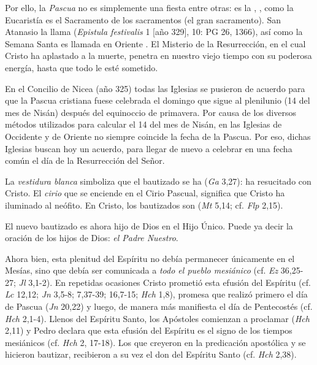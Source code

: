 \begin{ccebody}
 Por ello, la \textit{Pascua} no es simplemente una fiesta entre otras: es la , , como la Eucaristía es el Sacramento de los sacramentos (el gran sacramento). San Atanasio la llama  (\textit{Epistula festivalis} 1 [año 329], 10: PG 26, 1366), así como la Semana Santa es llamada en Oriente . El Misterio de la Resurrección, en el cual Cristo ha aplastado a la muerte, penetra en nuestro viejo tiempo con su poderosa energía, hasta que todo le esté sometido.

 En el Concilio de Nicea (año 325) todas las Iglesias se pusieron de acuerdo para que la Pascua cristiana fuese celebrada el domingo que sigue al plenilunio (14 del mes de Nisán) después del equinoccio de primavera. Por causa de los diversos métodos utilizados para calcular el 14 del mes de Nisán, en las Iglesias de Occidente y de Oriente no siempre coincide la fecha de la Pascua. Por eso, dichas Iglesias buscan hoy un acuerdo, para llegar de nuevo a celebrar en una fecha común el día de la Resurrección del Señor.

 La \textit{vestidura blanca} simboliza que el bautizado se ha  (\textit{Ga} 3,27): ha resucitado con Cristo. El \textit{cirio} que se enciende en el Cirio Pascual, significa que Cristo ha iluminado al neófito. En Cristo, los bautizados son  (\textit{Mt} 5,14; cf. \textit{Flp} 2,15).

El nuevo bautizado es ahora hijo de Dios en el Hijo Único. Puede ya decir la oración de los hijos de Dios: \textit{el Padre Nuestro}.

 Ahora bien, esta plenitud del Espíritu no debía permanecer únicamente en el Mesías, sino que debía ser comunicada a \textit{todo el pueblo mesiánico} (cf. \textit{Ez} 36,25-27; \textit{Jl} 3,1-2). En repetidas ocasiones Cristo prometió esta efusión del Espíritu (cf. \textit{Lc} 12,12; \textit{Jn} 3,5-8; 7,37-39; 16,7-15; \textit{Hch} 1,8), promesa que realizó primero el día de Pascua (\textit{Jn} 20,22) y luego, de manera más manifiesta el día de Pentecostés (cf. \textit{Hch} 2,1-4). Llenos del Espíritu Santo, los Apóstoles comienzan a proclamar  (\textit{Hch} 2,11) y Pedro declara que esta efusión del Espíritu es el signo de los tiempos mesiánicos (cf. \textit{Hch} 2, 17-18). Los que creyeron en la predicación apostólica y se hicieron bautizar, recibieron a su vez el don del Espíritu Santo (cf. \textit{Hch} 2,38).
\end{ccebody}

